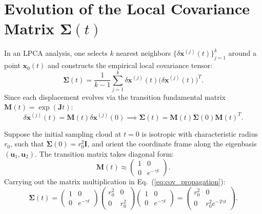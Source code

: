 \documentclass[11pt,a4paper]{article}
\begin{document}
\section{Evolution of the Local Covariance Matrix \texorpdfstring{$\mathbf{\Sigma}(t)$}{Sigma(t)}}
\label{sec:covariance_evolution}
In an LPCA analysis, one selects $k$ nearest neighbors $\{\delta\mathbf{x}^{(j)}(t)\}_{j=1}^k$ around a point $\mathbf{x}_0(t)$ and constructs the empirical local covariance tensor:
\begin{equation}
    \mathbf{\Sigma}(t) = \frac{1}{k-1} \sum_{j=1}^k \delta\mathbf{x}^{(j)}(t) \big(\delta\mathbf{x}^{(j)}(t)\big)^T.
    \label{eq:empirical_cov}
\end{equation}
Since each displacement evolves via the transition fundamental matrix $\mathbf{M}(t) = \exp(\mathbf{J}t)$:
\begin{equation}
    \delta\mathbf{x}^{(j)}(t) = \mathbf{M}(t) \delta\mathbf{x}^{(j)}(0) \implies \mathbf{\Sigma}(t) = \mathbf{M}(t) \mathbf{\Sigma}(0) \mathbf{M}(t)^T.
    \label{eq:cov_propagation}
\end{equation}

Suppose the initial sampling cloud at $t=0$ is isotropic with characteristic radius $r_0$, such that $\mathbf{\Sigma}(0) = r_0^2 \mathbf{I}$, and orient the coordinate frame along the eigenbasis $(\mathbf{u}_1, \mathbf{u}_2)$. The transition matrix takes diagonal form:
\begin{equation}
    \mathbf{M}(t) \approx \begin{pmatrix} 1 & 0 \\ 0 & e^{-\gamma t} \end{pmatrix}.
\end{equation}
Carrying out the matrix multiplication in Eq.~(\ref{eq:cov_propagation}):
\begin{equation}
    \mathbf{\Sigma}(t) = \begin{pmatrix} 1 & 0 \\ 0 & e^{-\gamma t} \end{pmatrix} \begin{pmatrix} r_0^2 & 0 \\ 0 & r_0^2 \end{pmatrix} \begin{pmatrix} 1 & 0 \\ 0 & e^{-\gamma t} \end{pmatrix} = \begin{pmatrix} r_0^2 & 0 \\ 0 & r_0^2 e^{-2\gamma t} \end{pmatrix}.
    \label{eq:sigma_diagonal}
\end{equation}
\end{document}
